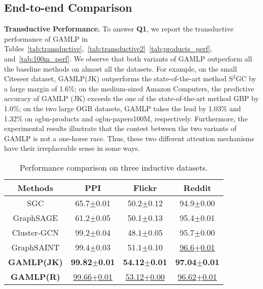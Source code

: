 \documentclass[sigconf]{acmart}
\begin{document}
\subsection{End-to-end Comparison}  

\textbf{Transductive Performance.}  To answer \textbf{Q1}, we report the transductive performance of GAMLP in Tables~\ref{tab:transductive},~\ref{tab:transductive2}~\ref{tab:products_perf}, and~\ref{tab:100m_perf}. 
We observe that both variants of GAMLP outperform all the baseline methods on almost all the datasets.
For example, on the small Citeseer dataset, GAMLP(JK) outperforms the state-of-the-art method S$^2$GC by a large margin of 1.6\%; on the medium-sized Amazon Computers, the predictive accuracy of GAMLP (JK) exceeds the one of the state-of-the-art method GBP by 1.0\%; on the two large OGB datasets, GAMLP takes the lead by 1.03\% and 1.32\% on ogbn-products and ogbn-papers100M, respectively.
Furthermore, the experimental results illustrate that the contest between the two variants of GAMLP is not a one-horse race.
Thus, these two different attention mechanisms have their irreplaceable sense in some ways.

\begin{table}
    \begin{center}
\caption{Performance comparison on three inductive datasets.}
    \label{tab:inductive}
    \vspace{-2mm}
    \begin{tabular}{c|ccc}
    \toprule
    \textbf{Methods} & \textbf{PPI} & \textbf{Flickr} & \textbf{Reddit} \\
    \midrule
    SGC & 65.7$\pm$0.01 & 50.2$\pm$0.12 & 94.9$\pm$0.00 \\
    GraphSAGE &  61.2$\pm$0.05  &  50.1$\pm$0.13  &  95.4$\pm$0.01   \\
    Cluster-GCN &  99.2$\pm$0.04  &  48.1$\pm$0.05  &  95.7$\pm$0.00  \\
    GraphSAINT& 99.4$\pm$0.03 & 51.1$\pm$0.10 & \underline{96.6$\pm$0.01} \\
    \midrule
    \textbf{GAMLP(JK)}   & \textbf{99.82$\pm$0.01} & \textbf{54.12$\pm$0.01} & \textbf{97.04$\pm$0.01} \\    
    \textbf{GAMLP(R)}   & \underline{99.66$\pm$0.01} & \underline{53.12$\pm$0.00} & \underline{96.62$\pm$0.01} \\       
    \bottomrule
    \end{tabular}
    \end{center}
    \vspace{-3mm}
\end{table}
\end{document}
